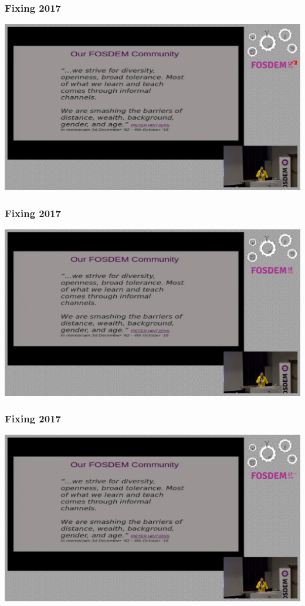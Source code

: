 \documentclass[t]{beamer}
\begin{document}
\begin{frame}
	\frametitle{Fixing 2017}
	\vfill
		\includegraphics[scale=0.15]{images/fix2017_red_ink.png}
	\vfill
\end{frame}

\begin{frame}
	\frametitle{Fixing 2017}
	\vfill
		\includegraphics[scale=0.2]{images/fixover.png}
	\vfill
\end{frame}

\begin{frame}
	\frametitle{Fixing 2017}
	\vfill
		\includegraphics[scale=0.2]{images/fix++.png}
	\vfill
\end{frame}
\end{document}
